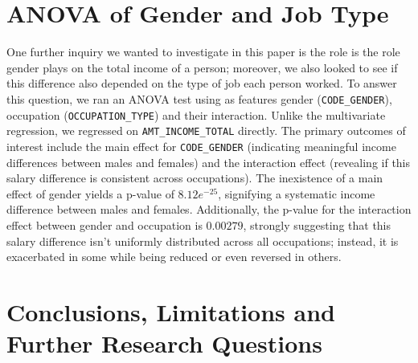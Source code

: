 \documentclass[hidelinks,12pt]{article}
\begin{document}
\section{ANOVA of Gender and Job Type}
One further inquiry we wanted to investigate in this paper is the role is the role gender plays on the total income of a person; moreover, we also looked to see if this difference also depended on the type of job each person worked. To answer this question, we ran an ANOVA test using as features gender (\verb|CODE_GENDER|), occupation (\verb|OCCUPATION_TYPE|) and their interaction. Unlike the multivariate regression, we regressed on \verb|AMT_INCOME_TOTAL| directly. The primary outcomes of interest include the main effect for \verb|CODE_GENDER| (indicating meaningful income differences between males and females) and the interaction effect (revealing if this salary difference is consistent across occupations). The inexistence of a main effect of gender yields a p-value of $8.12e^{-25}$, signifying a systematic income difference between males and females. Additionally, the p-value for the interaction effect between gender and occupation is $0.00279$, strongly suggesting that this salary difference isn’t uniformly distributed across all occupations; instead, it is exacerbated in some while being reduced or even reversed in others.

\section{Conclusions, Limitations and Further Research Questions}
  
\end{document}
